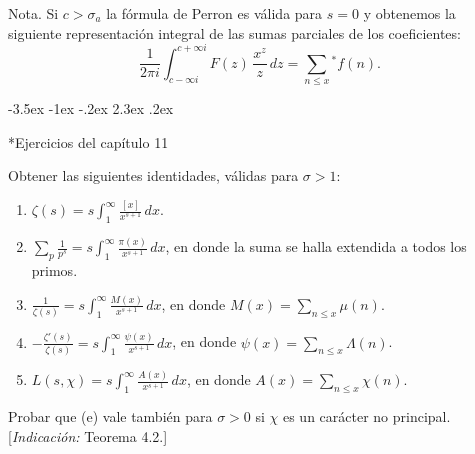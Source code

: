 \documentclass[12pt,a4paper]{book}
\makeatletter
\renewcommand\section{\@startsection{section}{1}{\z@}%
  {-3.5ex \@plus -1ex \@minus -.2ex}%
  {2.3ex \@plus .2ex}%
  {\normalfont\Large\bfseries\raggedright}}
\makeatother
\begin{document}
    Nota. Si $c>\sigma_{a}$ la fórmula de Perron es válida para $s=0$ y obtenemos la siguiente
    representación integral de las sumas parciales de los coeficientes:
    \begin{equation*}
        \frac{1}{2\pi i}\int_{c-\infty i}^{c+\infty i}F(z)\,\frac{x^{z}}{z}\,dz=\sum_{n\leq x}{}^{*}f(n).
    \end{equation*}

    \section*{Ejercicios del capítulo 11}

    \begin{ejercicio}
        Obtener las siguientes identidades, válidas para $\sigma>1$:
        \begin{enumerate}
            \item[(a)] $\displaystyle\zeta(s)=s\int_{1}^{\infty}\frac{[x]}{x^{s+1}}\,dx$.
            \item[(b)] $\displaystyle\sum_{p}\frac{1}{p^{s}}=s\int_{1}^{\infty}\frac{\pi(x)}{x^{s+1}}\,dx$, en donde la suma se halla extendida a todos los primos.
            \item[(c)] $\displaystyle\frac{1}{\zeta(s)}=s\int_{1}^{\infty}\frac{M(x)}{x^{s+1}}\,dx$, en donde $M(x)=\sum_{n\leq x}\mu(n)$.
            \item[(d)] $\displaystyle-\frac{\zeta'(s)}{\zeta(s)}=s\int_{1}^{\infty}\frac{\psi(x)}{x^{s+1}}\,dx$, en donde $\psi(x)=\sum_{n\leq x}\Lambda(n)$.
            \item[(e)] $\displaystyle L(s,\chi)=s\int_{1}^{\infty}\frac{A(x)}{x^{s+1}}\,dx$, en donde $A(x)=\sum_{n\leq x}\chi(n)$.
        \end{enumerate}
        Probar que (e) vale también para $\sigma>0$ si $\chi$ es un carácter no principal.
        [\textit{Indicación:} Teorema 4.2.]
    \end{ejercicio}
\end{document}
